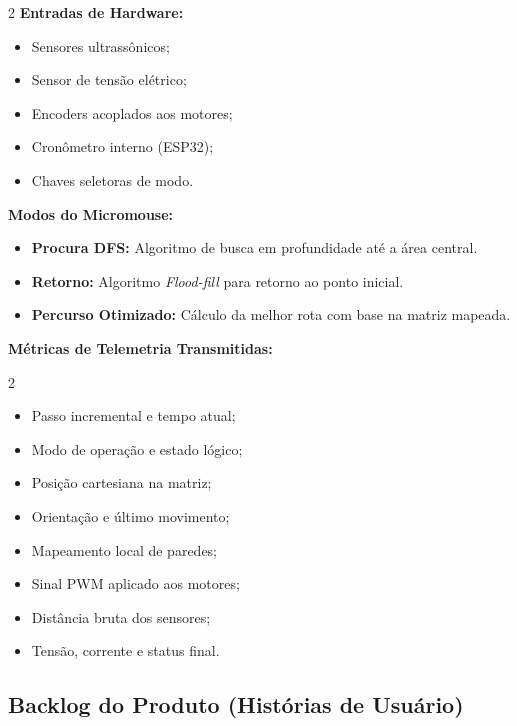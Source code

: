 \begin{multicols}{2}
\noindent \textbf{Entradas de Hardware:}
\begin{itemize}[noitemsep, topsep=2pt]
    \item Sensores ultrassônicos;
    \item Sensor de tensão elétrico;
    \item Encoders acoplados aos motores;
    \item Cronômetro interno (ESP32);
    \item Chaves seletoras de modo.
\end{itemize}

\columnbreak

\noindent \textbf{Modos do Micromouse:}
\begin{itemize}[noitemsep, topsep=2pt]
    \item \textbf{Procura DFS:} Algoritmo de busca em profundidade até a área central.
    \item \textbf{Retorno:} Algoritmo \textit{Flood-fill} para retorno ao ponto inicial.
    \item \textbf{Percurso Otimizado:} Cálculo da melhor rota com base na matriz mapeada.
\end{itemize}
\end{multicols}

\noindent \textbf{Métricas de Telemetria Transmitidas:}
\begin{multicols}{2}
\begin{itemize}[noitemsep, topsep=0pt]
    \item Passo incremental e tempo atual;
    \item Modo de operação e estado lógico;
    \item Posição cartesiana na matriz;
    \item Orientação e último movimento;
    \item Mapeamento local de paredes;
    \item Sinal PWM aplicado aos motores;
    \item Distância bruta dos sensores;
    \item Tensão, corrente e status final.
\end{itemize}
\end{multicols}

\subsection*{Backlog do Produto (Histórias de Usuário)}

